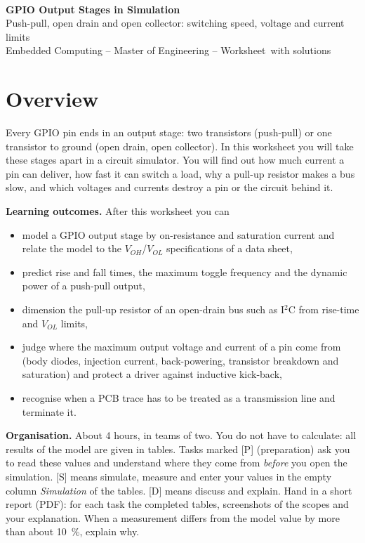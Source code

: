 \documentclass[a4paper,11pt]{article}
\newcounter{task}[section]
\begin{document}
\begin{center}
  \rwulogo\\[6mm]
  {\sffamily\bfseries\LARGE\color{rwuviolet} GPIO Output Stages in Simulation}\\[2mm]
  {\sffamily\Large\color{rwucyandark} Push-pull, open drain and open collector: switching speed, voltage and current limits}\\[3mm]
  {\sffamily Embedded Computing -- Master of Engineering -- Worksheet\ifdefined\solutions\ with solutions\fi}
\end{center}

\section*{Overview}

Every GPIO pin ends in an output stage: two transistors (push-pull) or one transistor to ground (open drain,
open collector). In this worksheet you will take these stages apart in a circuit simulator. You will find out
how much current a pin can deliver, how fast it can switch a load, why a pull-up resistor makes a bus slow,
and which voltages and currents destroy a pin or the circuit behind it.

\textbf{Learning outcomes.} After this worksheet you can
\begin{itemize}
  \item model a GPIO output stage by on-resistance and saturation current and relate the model to the
        $V_{OH}$/$V_{OL}$ specifications of a data sheet,
  \item predict rise and fall times, the maximum toggle frequency and the dynamic power of a push-pull output,
  \item dimension the pull-up resistor of an open-drain bus such as I$^2$C from rise-time and $V_{OL}$ limits,
  \item judge where the maximum output voltage and current of a pin come from (body diodes, injection current,
        back-powering, transistor breakdown and saturation) and protect a driver against inductive kick-back,
  \item recognise when a PCB trace has to be treated as a transmission line and terminate it.
\end{itemize}

\textbf{Organisation.} About 4 hours, in teams of two. You do not have to calculate: all results of the
model are given in tables. Tasks marked \textsf{[P]} (preparation) ask you to read these values and understand
where they come from \emph{before} you open the simulation. \textsf{[S]} means simulate, measure and enter your
values in the empty column \emph{Simulation} of the tables. \textsf{[D]} means discuss and explain. Hand in a short report (PDF): for each task the completed tables, screenshots of the
scopes and your explanation. When a measurement differs from the model value by
more than about \SI{10}{\percent}, explain why.
\end{document}
